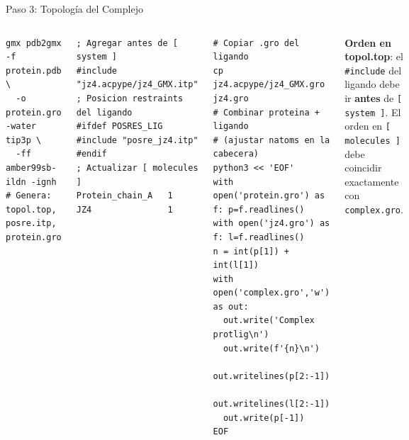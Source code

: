 \documentclass[aspectratio=169, 10pt]{beamer}
\begin{document}
\begin{frame}[fragile,shrink=5]{Paso 3: Topología del Complejo}
\begin{columns}[T]
\begin{tcolorbox}[definitionbox, title={3a. Topología de la proteína}]
\begin{lstlisting}[style=bashstyle]
gmx pdb2gmx -f protein.pdb \
  -o protein.gro -water tip3p \
  -ff amber99sb-ildn -ignh
# Genera: topol.top, posre.itp, protein.gro
\end{lstlisting}
\end{tcolorbox}
\vspace{0.3em}
\begin{tcolorbox}[warningbox, title={3c. Editar topol.top (añadir ligando)}]
\begin{lstlisting}[style=mdpstyle]
; Agregar antes de [ system ]
#include "jz4.acpype/jz4_GMX.itp"
; Posicion restraints del ligando
#ifdef POSRES_LIG
#include "posre_jz4.itp"
#endif
; Actualizar [ molecules ]
Protein_chain_A   1
JZ4               1
\end{lstlisting}
\end{tcolorbox}
\begin{tcolorbox}[formulabox, title={3b. Combinar coordenadas}]
\begin{lstlisting}[style=bashstyle]
# Copiar .gro del ligando
cp jz4.acpype/jz4_GMX.gro jz4.gro
# Combinar proteina + ligando
# (ajustar natoms en la cabecera)
python3 << 'EOF'
with open('protein.gro') as f: p=f.readlines()
with open('jz4.gro') as f: l=f.readlines()
n = int(p[1]) + int(l[1])
with open('complex.gro','w') as out:
  out.write('Complex protlig\n')
  out.write(f'{n}\n')
  out.writelines(p[2:-1])
  out.writelines(l[2:-1])
  out.write(p[-1])
EOF
\end{lstlisting}
\end{tcolorbox}
\begin{tcolorbox}[comparisonbox]
\small\textbf{Orden en topol.top}: el \texttt{\#include} del ligando
debe ir \textbf{antes} de \texttt{[ system ]}. El orden en \texttt{[ molecules ]}
debe coincidir exactamente con \texttt{complex.gro}.
\end{tcolorbox}
\end{columns}
\end{frame}
\end{document}
